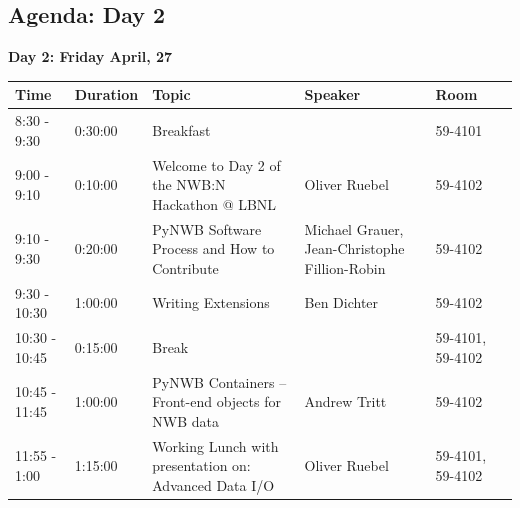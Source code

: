 \documentclass{article}
\begin{document}
\subsection{Agenda: Day 2}
\vspace{-0.1cm}
\textbf{Day 2: Friday April, 27}
\vspace{-0.2cm}
\begin{table}[h!]
\small
\centering
\label{tab:program:day2}
\begin{tabular}{|l|l|p{6cm}|p{2cm}|p{1.5cm}|l|}
\hline
\textbf{Time}       & \textbf{Duration} & \textbf{Topic}                                                                               & \textbf{Speaker}         & \textbf{Room}                               & \textbf{}           \\ \hline \hline
8:30 - 9:30         & 0:30:00           & Breakfast                                                                                    &                          & 59-4101                                     & \cellcolor{gray!25}  \\ \hline
9:00 - 9:10         & 0:10:00           & Welcome to Day 2 of the NWB:N Hackathon @ LBNL                                               &  Oliver Ruebel           & 59-4102                                     & \cellcolor{blue!}  \\ \hline
9:10 - 9:30         & 0:20:00           & PyNWB Software Process and How to Contribute                                                 &  Michael Grauer, Jean-Christophe Fillion-Robin     & 59-4102           & \cellcolor{blue!}  \\ \hline
9:30 - 10:30        & 1:00:00           & Writing Extensions                                                                           &  Ben Dichter             & 59-4102                                     & \cellcolor{yellow!}  \\ \hline
10:30 - 10:45       & 0:15:00           & Break                                                                                        &                          & 59-4101, 59-4102                            & \cellcolor{gray!25} \\ \hline
10:45 - 11:45       & 1:00:00           & PyNWB Containers – Front-end objects for NWB data                                            &  Andrew Tritt            & 59-4102                                     & \cellcolor{yellow!}  \\ \hline
11:55 - 1:00        & 1:15:00           & Working Lunch with presentation on: Advanced Data I/O                                        &  Oliver Ruebel           & 59-4101, 59-4102                            & \cellcolor{gray!25} \\ \hline

\end{tabular}
\end{table}
\end{document}
